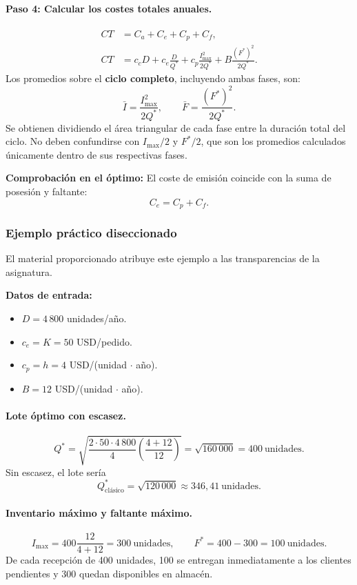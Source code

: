 \documentclass[11pt,a4paper]{article}
\begin{document}
\paragraph{Paso 4: Calcular los costes totales anuales.}
\begin{align*}
    CT & =C_a+C_e+C_p+C_f,        \\
    CT & =c_cD+c_e\frac{D}{Q^{*}}
    +c_p\frac{I_{\max}^{2}}{2Q^{*}}
    +B\frac{(F^{*})^{2}}{2Q^{*}}.
\end{align*}
Los promedios sobre el \textbf{ciclo completo}, incluyendo ambas fases, son:
\[
    \bar{I}=\frac{I_{\max}^{2}}{2Q^{*}},
    \qquad
    \bar{F}=\frac{(F^{*})^{2}}{2Q^{*}}.
\]
Se obtienen dividiendo el área triangular de cada fase entre la duración total del ciclo. No deben confundirse con $I_{\max}/2$ y $F^{*}/2$, que son los promedios calculados únicamente dentro de sus respectivas fases.

\textbf{Comprobación en el óptimo:} El coste de emisión coincide con la suma de posesión y faltante:
\[
    C_e=C_p+C_f.
\]

\subsubsection{Ejemplo práctico diseccionado}
El material proporcionado atribuye este ejemplo a las transparencias de la asignatura.

\textbf{Datos de entrada:}
\begin{itemize}
    \item $D=4\,800$ unidades/año.
    \item $c_e=K=50$ USD/pedido.
    \item $c_p=h=4$ USD/(unidad $\cdot$ año).
    \item $B=12$ USD/(unidad $\cdot$ año).
\end{itemize}

\paragraph{Lote óptimo con escasez.}
\[
    Q^{*}=\sqrt{\frac{2\cdot50\cdot4\,800}{4}
        \left(\frac{4+12}{12}\right)}
    =\sqrt{160\,000}
    =\boxed{400\ \text{unidades}}.
\]
Sin escasez, el lote sería
\[
    Q_{\text{clásico}}^{*}=\sqrt{120\,000}
    \approx346{,}41\ \text{unidades}.
\]

\paragraph{Inventario máximo y faltante máximo.}
\[
    I_{\max}=400\frac{12}{4+12}
    =\boxed{300\ \text{unidades}},
    \qquad
    F^{*}=400-300=\boxed{100\ \text{unidades}}.
\]
De cada recepción de 400 unidades, 100 se entregan inmediatamente a los clientes pendientes y 300 quedan disponibles en almacén.
\end{document}
